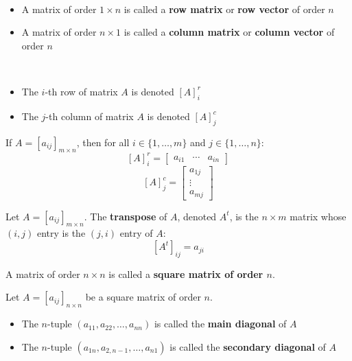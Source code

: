 \begin{definition}\label{def:row-column-vectors}\
    \begin{itemize}
        \item A matrix of order $1 \times n$ is called a \textbf{row matrix} or \textbf{row vector} of order $n$
        \item A matrix of order $n \times 1$ is called a \textbf{column matrix} or \textbf{column vector} of order $n$
    \end{itemize}
\end{definition}

\begin{notation}\
    \begin{itemize}
        \item The $i$-th row of matrix $A$ is denoted $[A]_i^r$
        \item The $j$-th column of matrix $A$ is denoted $[A]_j^c$
    \end{itemize}
\end{notation}

\begin{eg}
    If $A = [a_{ij}]_{m \times n}$, then for all $i \in \{1, \ldots, m\}$ and $j \in \{1, \ldots, n\}$:
    \[
    [A]_i^r = \begin{bmatrix} a_{i1} & \cdots & a_{in} \end{bmatrix}
    \]
    \[
    [A]_j^c = \begin{bmatrix} a_{1j} \\ \vdots \\ a_{mj} \end{bmatrix}
    \]
\end{eg}

\begin{definition}[Transpose]\label{def:transpose}
    Let $A = [a_{ij}]_{m \times n}$. The \textbf{transpose} of $A$, denoted $A^t$, is the $n \times m$ matrix whose $(i,j)$ entry is the $(j,i)$ entry of $A$:
    \[
    [A^t]_{ij} = a_{ji}
    \]
\end{definition}

\begin{definition}\label{def:square-matrix}
    A matrix of order $n \times n$ is called a \textbf{square matrix of order $n$}.
\end{definition}

\begin{definition}[Diagonals]\label{def:diagonals}
    Let $A = [a_{ij}]_{n \times n}$ be a square matrix of order $n$.
    \begin{itemize}
        \item The $n$-tuple $(a_{11}, a_{22}, \ldots, a_{nn})$ is called the \textbf{main diagonal} of $A$
        \item The $n$-tuple $(a_{1n}, a_{2,n-1}, \ldots, a_{n1})$ is called the \textbf{secondary diagonal} of $A$
    \end{itemize}
\end{definition}


